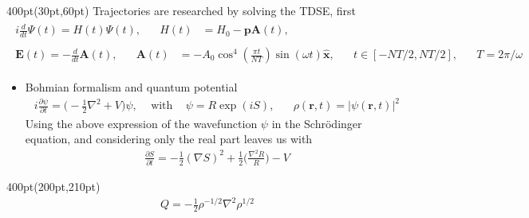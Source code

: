 \begin{frame}
\begin{textblock*}{400pt}(30pt,60pt)
Trajectories are researched by solving the TDSE, first
\begin{align}
\begin{split}
 i\frac{d}{dt}\Psi(t) = H(t)\Psi(t), 
   \hspace{20pt} H(t) & = H_0 - \boldsymbol{p}\boldsymbol{A}(t),
\end{split}
 \nonumber \\
\begin{split}
\boldsymbol{E}(t) = -\frac{d}{dt}\boldsymbol{A}(t), \hspace{20pt}
\boldsymbol{A}(t) &= -A_0 \cos^4\left(\frac{\pi t}{NT}\right)\sin (\omega t)\boldsymbol{\hat{x}}, \hspace{20pt}
 t \in \left[ -NT/2, NT/2 \right], \hspace{20pt} T = 2\pi/\omega
\end{split} \nonumber
\end{align}
\begin{itemize}
\item Bohmian formalism and quantum potential
\begin{align}
 i\frac{\partial \psi}{\partial t} = \Bigg( -\frac{1}{2}\nabla^2 + V\Bigg)\psi,
\hspace{10pt} \mbox{ with } \hspace{10pt} \psi = R\exp(iS), 
\hspace{20pt} 
\rho(\boldsymbol{r},t) = \left| \psi(\boldsymbol{r},t)\right|^2\nonumber
\end{align}
Using the above expression of the wavefunction $\psi$ in the 
Schr\"odinger equation, and considering only the real part 
leaves us with 
\begin{align}
 \frac{\partial S}{\partial t} = -\frac{1}{2}(\nabla S)^2 
          + \frac{1}{2}\Bigg( \frac{\nabla^2 R}{R} \Bigg) - V \nonumber
\end{align}

\end{itemize}
\end{textblock*}


\begin{textblock*}{400pt}(200pt,210pt)
\begin{align}
Q = -\frac{1}{2} \rho^{-1/2} \nabla^2 \rho^{1/2}
\end{align}
\end{textblock*}



\end{frame}


